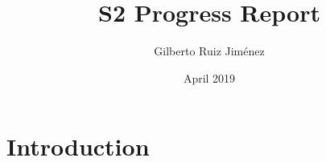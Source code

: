 \documentclass{article}
\title{S2 Progress Report}
\author{Gilberto Ruiz Jiménez}
\date{April 2019}
\begin{document}
\maketitle

\section{Introduction}
\end{document}

